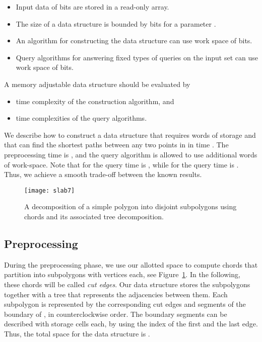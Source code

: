 \documentclass[11pt,a4paper]{article}
\begin{document}
\begin{itemize}
\item Input data of  bits are stored in a
read-only array.
\item The size of a data structure is bounded by 
bits for a parameter .
\item An algorithm for constructing the data structure can
use work space of  bits.
\item Query algorithms for answering fixed types of queries
on the input set can use work space of  bits.
\end{itemize}

A memory adjustable data structure should be evaluated by
\begin{itemize}
\item time complexity of the construction algorithm, and
\item time complexities of the query algorithms.
\end{itemize}
\fi

We describe how to construct a data structure that requires 
words of storage and that can find the shortest paths between any two
points in  in time . The preprocessing time is , and
the query algorithm is allowed to use  additional words of work-space.
Note that for  the query time is , while for
 the query time is . Thus, we achieve a smooth trade-off between
the known results.


\begin{figure}[htbp]
\centerline{\texttt{[image: slab7]}}
\caption{A decomposition of a simple polygon into
 disjoint subpolygons using  chords and its
associated tree decomposition.}
\label{fig:slab7}
\end{figure}

\subsection{Preprocessing}
During the preprocessing phase, we use our allotted space to
compute  chords that partition  into  subpolygons with
 vertices each, see Figure~\ref{fig:slab7}.
In the following, these chords will be called
\emph{cut edges}. Our data structure stores the subpolygons
together with a tree that represents the adjacencies between them.
Each subpolygon is represented by the corresponding cut edges and segments of
the boundary of , in counterclockwise order. The boundary segments
can be described with  storage cells each, by using
the index of the first and the last edge. Thus, the total
space for the data structure is .
\end{document}
